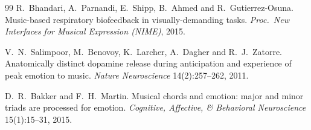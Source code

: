 \documentclass[12pt,a4paper]{article}
\begin{document}
\begin{thebibliography}{99}
 R.~Bhandari, A.~Parnandi, E.~Shipp, B.~Ahmed and R.~Gutierrez-Osuna. Music-based respiratory biofeedback in visually-demanding tasks. \textit{Proc.\ New Interfaces for Musical Expression (NIME)}, 2015.

 V.~N.~Salimpoor, M.~Benovoy, K.~Larcher, A.~Dagher and R.~J.~Zatorre. Anatomically distinct dopamine release during anticipation and experience of peak emotion to music. \textit{Nature Neuroscience} 14(2):257--262, 2011.

 D.~R.~Bakker and F.~H.~Martin. Musical chords and emotion: major and minor triads are processed for emotion. \textit{Cognitive, Affective, \& Behavioral Neuroscience} 15(1):15--31, 2015.

\end{thebibliography}
\end{document}
